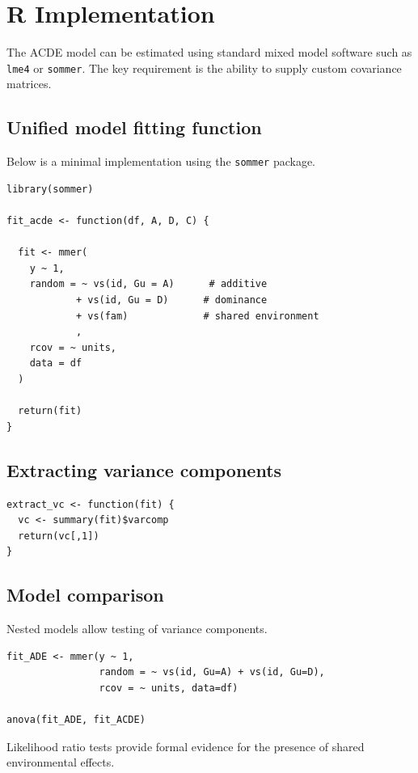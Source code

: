 \documentclass[11pt]{article}
\begin{document}
\section{R Implementation}

The ACDE model can be estimated using standard mixed model software such as 
\texttt{lme4} or \texttt{sommer}. The key requirement is the ability to supply 
custom covariance matrices.

\subsection{Unified model fitting function}

Below is a minimal implementation using the \texttt{sommer} package.

\begin{verbatim}
library(sommer)

fit_acde <- function(df, A, D, C) {

  fit <- mmer(
    y ~ 1,
    random = ~ vs(id, Gu = A)      # additive
            + vs(id, Gu = D)      # dominance
            + vs(fam)             # shared environment
            ,
    rcov = ~ units,
    data = df
  )

  return(fit)
}
\end{verbatim}

\subsection{Extracting variance components}

\begin{verbatim}
extract_vc <- function(fit) {
  vc <- summary(fit)$varcomp
  return(vc[,1])
}
\end{verbatim}

\subsection{Model comparison}

Nested models allow testing of variance components.

\begin{verbatim}
fit_ADE <- mmer(y ~ 1,
                random = ~ vs(id, Gu=A) + vs(id, Gu=D),
                rcov = ~ units, data=df)

anova(fit_ADE, fit_ACDE)
\end{verbatim}

Likelihood ratio tests provide formal evidence for the presence of shared 
environmental effects.
\end{document}
